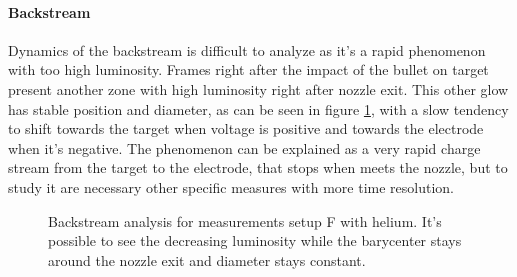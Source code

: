 \paragraph{Backstream}
Dynamics of the backstream is difficult to analyze as it's a rapid phenomenon with too high luminosity. Frames right after the impact of the bullet on target present another zone with high luminosity right after nozzle exit. This other glow has stable position and diameter, as can be seen in figure \ref{fig:elio_a_back}, with a slow tendency to shift towards the target when voltage is positive and towards the electrode when it's negative.
The phenomenon can be explained as a very rapid charge stream from the target to the electrode, that stops when meets the nozzle, but to study it are necessary other specific measures with more time resolution.
\begin{figure}
 \centering
 \hfill
 
 \hfill
 \caption{Backstream analysis for measurements setup F with helium. It's possible to see the decreasing luminosity while the barycenter stays around the nozzle exit and diameter stays constant.}
 \label{fig:elio_a_back}
\end{figure}


